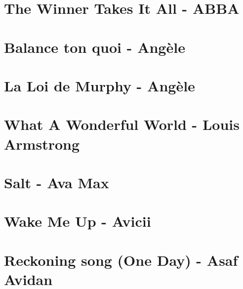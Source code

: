 \documentclass[11pt]{article}
\begin{document}
\linespread{0.3}
\tableofcontents
\newpage


\section{The Winner Takes It All - ABBA}
\begin{guitar}

\end{guitar}

\section{Balance ton quoi - Angèle}
\begin{guitar}

\end{guitar}

\section{La Loi de Murphy - Angèle}
\begin{guitar}

\end{guitar}


\section*{What A Wonderful World - Louis Armstrong}
\begin{guitar}

\end{guitar}

\section{Salt - Ava Max}



\section{Wake Me Up - Avicii}



\section{Reckoning song (One Day) - Asaf Avidan}
\begin{guitar}

\end{guitar}
\end{document}

